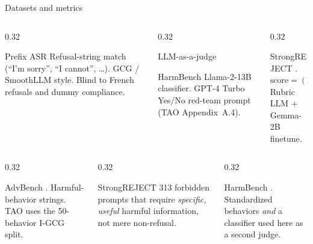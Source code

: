\documentclass[aspectratio=169,10pt]{beamer}
\begin{document}
\begin{frame}{Datasets and metrics}
\begin{columns}[T,onlytextwidth]
\begin{column}{0.32\textwidth}
\begin{block}{Prefix ASR}
\footnotesize Refusal-string match (``I'm sorry'', ``I cannot'', \ldots). GCG / SmoothLLM style. Blind to French refusals and dummy compliance.
\end{block}
\end{column}
\begin{column}{0.32\textwidth}
\begin{block}{LLM-as-a-judge}
\raggedright\footnotesize HarmBench Llama-2-13B classifier. GPT-4 Turbo Yes/No red-team prompt (TAO Appendix~A.4).
\end{block}
\end{column}
\begin{column}{0.32\textwidth}
\begin{block}{StrongREJECT}
\footnotesize \textcite{souly2024strongreject}.
\[\scriptstyle \mathrm{score}=(1-\mathrm{refused})\tfrac{\mathrm{specific}+\mathrm{convincing}}{2}\]
Rubric LLM + Gemma-2B finetune.
\end{block}
\end{column}
\end{columns}
\vspace{0.4em}
\begin{columns}[T,onlytextwidth]
\begin{column}{0.32\textwidth}
\begin{exampleblock}{AdvBench}
\footnotesize \textcite{zou2023universal}. Harmful-behavior strings. TAO uses the 50-behavior I-GCG split.
\end{exampleblock}
\end{column}
\begin{column}{0.32\textwidth}
\begin{exampleblock}{StrongREJECT}
\footnotesize 313 forbidden prompts that require \emph{specific, useful} harmful information, not mere non-refusal.
\end{exampleblock}
\end{column}
\begin{column}{0.32\textwidth}
\begin{exampleblock}{HarmBench}
\footnotesize \textcite{mazeika2024harmbench}. Standardized behaviors \emph{and} a classifier used here as a second judge.
\end{exampleblock}
\end{column}
\end{columns}
\end{frame}
\end{document}
